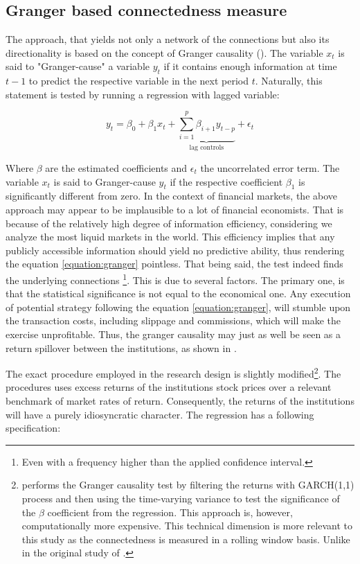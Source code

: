 \documentclass[12pt]{article}
\begin{document}
\subsection{Granger based connectedness measure}\label{subsection:granger}

The approach, that yields not only a network of the connections but also its directionality is based on the concept of Granger causality (\cite{granger69}). The variable $x_t$ is said to "Granger-cause" a variable $y_t$ if it contains enough information at time $t-1$ to predict the respective variable in the next period $t$. Naturally, this statement is tested by running a regression with lagged variable:

\begin{equation}\label{equation:granger}
	y_t = \beta_0 + \beta_1 x_t + \underbrace{\sum_{i=1}^{p} \beta_{i+1} y_{t - p}}_{\text{lag controls}} + \epsilon_t
\end{equation}

Where $\beta$ are the estimated coefficients and $\epsilon_t$ the uncorrelated error term. The variable $x_t$ is said to Granger-cause $y_t$ if the respective coefficient $\beta_1$ is significantly different from zero.
In the context of financial markets, the above approach may appear to be implausible to a lot of financial economists. That is because of the relatively high degree of information efficiency, considering we analyze the most liquid markets in the world. This efficiency implies that any publicly accessible information should yield no predictive ability, thus rendering the equation \ref{equation:granger} pointless. That being said, the test indeed finds the underlying connections \footnote{Even with a frequency higher than the applied confidence interval.}. This is due to several factors. The primary one, is that the statistical significance is not equal to the economical one. Any execution of potential strategy following the equation \ref{equation:granger}, will stumble upon the transaction costs, including slippage and commissions, which will make the exercise unprofitable. Thus, the granger causality may just as well be seen as a return spillover between the institutions, as shown in \cite{battison12}.

The exact procedure employed in the research design is slightly modified\footnote{\cite{billio12} performs the Granger causality test by filtering the returns with GARCH(1,1) process and then using the time-varying variance to test the significance of the $\beta$ coefficient from the regression. This approach is, however, computationally more expensive. This technical dimension is more relevant to this study as the connectedness is measured in a rolling window basis. Unlike in the original study of \cite{billio12}.}. The procedures uses excess returns of the institutions stock prices over a relevant benchmark of market rates of return. Consequently, the returns of the institutions will have a purely idiosyncratic character. The regression has a following specification:
\end{document}
